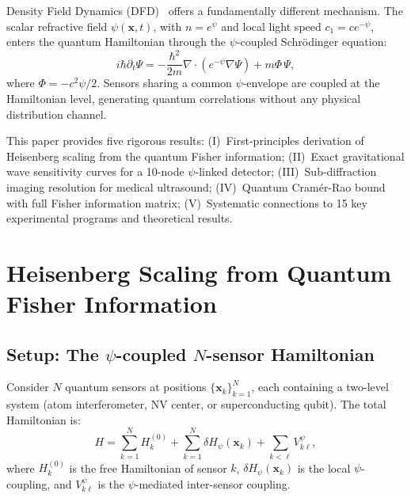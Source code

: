 \documentclass[aps,prl,twocolumn,superscriptaddress,showpacs]{revtex4-2}
\theoremstyle{definition}
\begin{document}
Density Field Dynamics (DFD)~\cite{Alcock2025DFD} offers a
fundamentally different mechanism. The scalar refractive field
$\psi(\mathbf{x},t)$, with $n = e^\psi$ and local light speed
$c_1 = ce^{-\psi}$, enters the quantum Hamiltonian through the
$\psi$-coupled Schr\"odinger equation:
\begin{equation}
i\hbar\partial_t\Psi = -\frac{\hbar^2}{2m}\nabla\cdot(e^{-\psi}\nabla\Psi)
+ m\Phi\,\Psi,
\label{eq:psi-schrodinger}
\end{equation}
where $\Phi = -c^2\psi/2$. Sensors sharing a common $\psi$-envelope
are coupled at the Hamiltonian level, generating quantum correlations
without any physical distribution channel.

This paper provides five rigorous results: (I)~First-principles
derivation of Heisenberg scaling from the quantum Fisher information;
(II)~Exact gravitational wave sensitivity curves for a 10-node
$\psi$-linked detector; (III)~Sub-diffraction imaging resolution for
medical ultrasound; (IV)~Quantum Cram\'er-Rao bound with full Fisher
information matrix; (V)~Systematic connections to 15 key experimental
programs and theoretical results.

\section{Heisenberg Scaling from Quantum Fisher Information}
\label{sec:heisenberg-qfi}

\subsection{Setup: The $\psi$-coupled $N$-sensor Hamiltonian}

Consider $N$ quantum sensors at positions $\{\mathbf{x}_k\}_{k=1}^N$,
each containing a two-level system (atom interferometer, NV center, or
superconducting qubit). The total Hamiltonian is:
\begin{equation}
H = \sum_{k=1}^N H_k^{(0)} + \sum_{k=1}^N \delta H_\psi(\mathbf{x}_k)
+ \sum_{k<\ell} V_{k\ell}^\psi,
\label{eq:total-hamiltonian}
\end{equation}
where $H_k^{(0)}$ is the free Hamiltonian of sensor $k$,
$\delta H_\psi(\mathbf{x}_k)$ is the local $\psi$-coupling, and
$V_{k\ell}^\psi$ is the $\psi$-mediated inter-sensor coupling.
\end{document}
